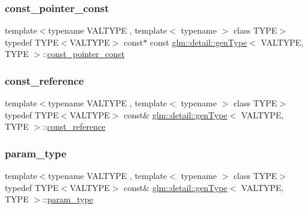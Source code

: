 \subsubsection{\texorpdfstring{const\+\_\+pointer\+\_\+const}{const\_pointer\_const}}
{\footnotesize\ttfamily template$<$typename V\+A\+L\+T\+Y\+PE , template$<$ typename $>$ class T\+Y\+PE$>$ \\
typedef T\+Y\+PE$<$V\+A\+L\+T\+Y\+PE$>$ const$\ast$ const \hyperlink{structglm_1_1detail_1_1gen_type}{glm\+::detail\+::gen\+Type}$<$ V\+A\+L\+T\+Y\+PE, T\+Y\+PE $>$\+::\hyperlink{structglm_1_1detail_1_1gen_type_a4f3f1bc18abdbdba5757fc63052157fa}{const\+\_\+pointer\+\_\+const}}

\mbox{\label{structglm_1_1detail_1_1gen_type_a509ca374a85f8a9ea319bc5a980d5f1a}} 
\subsubsection{\texorpdfstring{const\+\_\+reference}{const\_reference}}
{\footnotesize\ttfamily template$<$typename V\+A\+L\+T\+Y\+PE , template$<$ typename $>$ class T\+Y\+PE$>$ \\
typedef T\+Y\+PE$<$V\+A\+L\+T\+Y\+PE$>$ const\& \hyperlink{structglm_1_1detail_1_1gen_type}{glm\+::detail\+::gen\+Type}$<$ V\+A\+L\+T\+Y\+PE, T\+Y\+PE $>$\+::\hyperlink{structglm_1_1detail_1_1gen_type_a509ca374a85f8a9ea319bc5a980d5f1a}{const\+\_\+reference}}

\mbox{\label{structglm_1_1detail_1_1gen_type_a92c8b989f574a63d4e0f5bfc8a4f3a32}} 
\subsubsection{\texorpdfstring{param\+\_\+type}{param\_type}}
{\footnotesize\ttfamily template$<$typename V\+A\+L\+T\+Y\+PE , template$<$ typename $>$ class T\+Y\+PE$>$ \\
typedef T\+Y\+PE$<$V\+A\+L\+T\+Y\+PE$>$ const\& \hyperlink{structglm_1_1detail_1_1gen_type}{glm\+::detail\+::gen\+Type}$<$ V\+A\+L\+T\+Y\+PE, T\+Y\+PE $>$\+::\hyperlink{structglm_1_1detail_1_1gen_type_a92c8b989f574a63d4e0f5bfc8a4f3a32}{param\+\_\+type}}

